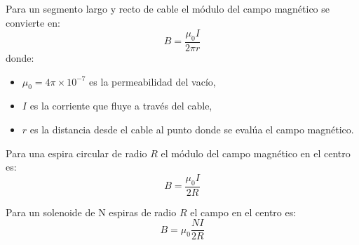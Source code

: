 Para un segmento largo y recto de cable el módulo del campo magnético se convierte en:
\begin{equation*}
  B = \frac{\mu_0 I}{2\pi r}
\end{equation*}
donde:
\begin{itemize}
  \item \(\mu_0 = 4 \pi \times 10^{-7}\) es la permeabilidad del vacío,
  \item \(I\) es la corriente que fluye a través del cable,
  \item \(r\) es la distancia desde el cable al punto donde se evalúa el campo magnético.
\end{itemize}

\noindent Para una espira circular de radio \(R\) el módulo del campo magnético en el centro es:
\begin{equation*}
  B = \frac{\mu_0 I}{2R}
\end{equation*}

\noindent Para un solenoide de N espiras de radio \(R\) el campo en el centro es:
\begin{equation*}
  B = \mu_0 \frac{N I}{2R}
\end{equation*}
